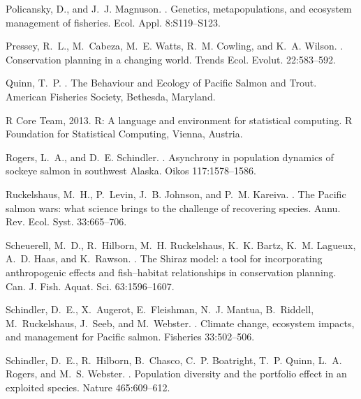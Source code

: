 \documentclass[12pt,english]{article}
\begin{document}
\begin{spacing}{1.3}
\begin{thebibliography}{64}
Policansky, D., and J.~J. Magnuson.
.
\newblock Genetics, metapopulations, and ecosystem management of fisheries.
\newblock Ecol. Appl. 8:S119--S123.

Pressey, R.~L., M.~Cabeza, M.~E. Watts, R.~M. Cowling, and K.~A. Wilson.
.
\newblock Conservation planning in a changing world.
\newblock Trends Ecol. Evolut. 22:583--592.

Quinn, T.~P.
.
\newblock The Behaviour and Ecology of Pacific Salmon and Trout.
\newblock American Fisheries Society, Bethesda, Maryland.

{\textsf{R} Core Team}, 2013.
\newblock \textsf{R}: {A} language and environment for statistical computing.
\newblock \textsf{R} Foundation for Statistical Computing, Vienna, Austria.

Rogers, L.~A., and D.~E. Schindler.
.
\newblock Asynchrony in population dynamics of sockeye salmon in southwest
  {Alaska}.
\newblock Oikos 117:1578--1586.

Ruckelshaus, M.~H., P.~Levin, J.~B. Johnson, and P.~M. Kareiva.
.
\newblock The {Pacific} salmon wars: what science brings to the challenge of
  recovering species.
\newblock Annu. Rev. Ecol. Syst. 33:665--706.

Scheuerell, M.~D., R.~Hilborn, M.~H. Ruckelshaus, K.~K. Bartz, K.~M. Lagueux,
  A.~D. Haas, and K.~Rawson.
.
\newblock The {Shiraz} model: a tool for incorporating anthropogenic effects
  and fish--habitat relationships in conservation planning.
\newblock Can. J. Fish. Aquat. Sci. 63:1596--1607.

Schindler, D.~E., X.~Augerot, E.~Fleishman, N.~J. Mantua, B.~Riddell,
  M.~Ruckelshaus, J.~Seeb, and M.~Webster.
.
\newblock Climate change, ecosystem impacts, and management for {Pacific}
  salmon.
\newblock Fisheries 33:502--506.

Schindler, D.~E., R.~Hilborn, B.~Chasco, C.~P. Boatright, T.~P. Quinn, L.~A.
  Rogers, and M.~S. Webster.
.
\newblock Population diversity and the portfolio effect in an exploited
  species.
\newblock Nature 465:609--612.


\end{thebibliography}
\end{spacing}
\end{document}
